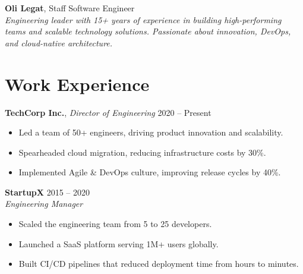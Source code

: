 \documentclass[a4paper,10pt]{article}
\begin{document}
\noindent
\begin{minipage}[t]{0.65\textwidth}
    \hspace{-1.05cm}
    \colorbox{headerbg}{%
    \begin{minipage}[t]{\dimexpr\textwidth + 0.9cm}
        \vspace{0.5cm} %
        {\color{navy} \LARGE \textbf{Oli Legat}}{\Large, Staff Software Engineer}\\[0.5em]
        \textit{Engineering leader with 15+ years of experience in building high-performing teams and scalable technology solutions. Passionate about innovation, DevOps, and cloud-native architecture.}\\[0.5em]
    \end{minipage}%
    }

    \section*{\color{navy} Work Experience}
    \textbf{TechCorp Inc.}, \textit{Director of Engineering} \hfill 2020 -- Present\\
    \begin{itemize}[leftmargin=1.5em, nosep]
        \item Led a team of 50+ engineers, driving product innovation and scalability.
        \item Spearheaded cloud migration, reducing infrastructure costs by 30\%.
        \item Implemented Agile \& DevOps culture, improving release cycles by 40\%.
    \end{itemize}

    \vspace{0.5em}
    \textbf{StartupX} \hfill 2015 -- 2020\\
    \textit{Engineering Manager}\\
    \begin{itemize}[leftmargin=1.5em, nosep]
        \item Scaled the engineering team from 5 to 25 developers.
        \item Launched a SaaS platform serving 1M+ users globally.
        \item Built CI/CD pipelines that reduced deployment time from hours to minutes.
    \end{itemize}


\end{minipage}
\end{document}
